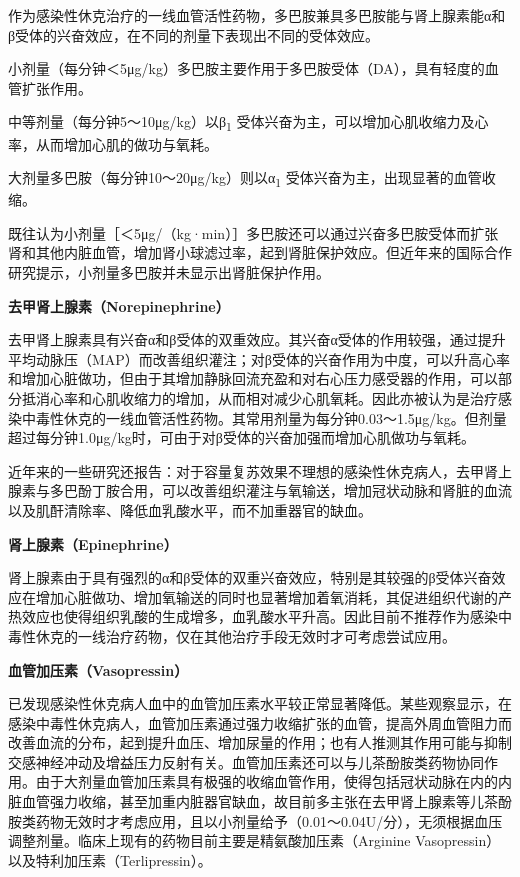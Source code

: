 作为感染性休克治疗的一线血管活性药物，多巴胺兼具多巴胺能与肾上腺素能α和β受体的兴奋效应，在不同的剂量下表现出不同的受体效应。

小剂量（每分钟＜5μg/kg）多巴胺主要作用于多巴胺受体（DA），具有轻度的血管扩张作用。

中等剂量（每分钟5～10μg/kg）以β\textsubscript{1}
受体兴奋为主，可以增加心肌收缩力及心率，从而增加心肌的做功与氧耗。

大剂量多巴胺（每分钟10～20μg/kg）则以α\textsubscript{1}
受体兴奋为主，出现显著的血管收缩。

既往认为小剂量［＜5μg/（kg·min）］多巴胺还可以通过兴奋多巴胺受体而扩张肾和其他内脏血管，增加肾小球滤过率，起到肾脏保护效应。但近年来的国际合作研究提示，小剂量多巴胺并未显示出肾脏保护作用。

\textbf{去甲肾上腺素（Norepinephrine）}

去甲肾上腺素具有兴奋α和β受体的双重效应。其兴奋α受体的作用较强，通过提升平均动脉压（MAP）而改善组织灌注；对β受体的兴奋作用为中度，可以升高心率和增加心脏做功，但由于其增加静脉回流充盈和对右心压力感受器的作用，可以部分抵消心率和心肌收缩力的增加，从而相对减少心肌氧耗。因此亦被认为是治疗感染中毒性休克的一线血管活性药物。其常用剂量为每分钟0.03～1.5μg/kg。但剂量超过每分钟1.0μg/kg时，可由于对β受体的兴奋加强而增加心肌做功与氧耗。

近年来的一些研究还报告：对于容量复苏效果不理想的感染性休克病人，去甲肾上腺素与多巴酚丁胺合用，可以改善组织灌注与氧输送，增加冠状动脉和肾脏的血流以及肌酐清除率、降低血乳酸水平，而不加重器官的缺血。

\textbf{肾上腺素（Epinephrine）}

肾上腺素由于具有强烈的α和β受体的双重兴奋效应，特别是其较强的β受体兴奋效应在增加心脏做功、增加氧输送的同时也显著增加着氧消耗，其促进组织代谢的产热效应也使得组织乳酸的生成增多，血乳酸水平升高。因此目前不推荐作为感染中毒性休克的一线治疗药物，仅在其他治疗手段无效时才可考虑尝试应用。

\textbf{血管加压素（Vasopressin）}

已发现感染性休克病人血中的血管加压素水平较正常显著降低。某些观察显示，在感染中毒性休克病人，血管加压素通过强力收缩扩张的血管，提高外周血管阻力而改善血流的分布，起到提升血压、增加尿量的作用；也有人推测其作用可能与抑制交感神经冲动及增益压力反射有关。血管加压素还可以与儿茶酚胺类药物协同作用。由于大剂量血管加压素具有极强的收缩血管作用，使得包括冠状动脉在内的内脏血管强力收缩，甚至加重内脏器官缺血，故目前多主张在去甲肾上腺素等儿茶酚胺类药物无效时才考虑应用，且以小剂量给予（0.01～0.04U/分），无须根据血压调整剂量。临床上现有的药物目前主要是精氨酸加压素（Arginine
Vasopressin）以及特利加压素（Terlipressin）。


